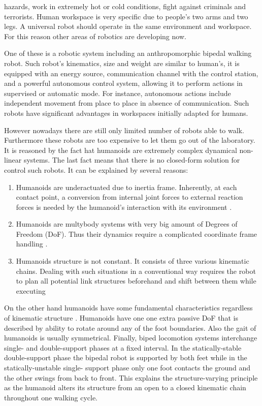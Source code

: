 \documentclass[12pt,a4paper]{report}
\begin{document}
hazards, work in extremely hot or cold conditions, fight against criminals and terrorists.
		Human workspace is very specific due to people's two arms and two legs. A universal robot should operate in the same environment and workspace. For this reason other areas of robotics are developing now.
		
		One of these is a robotic system including an anthropomorphic bipedal walking robot. Such robot's kinematics, size and weight are similar to human's, it is equipped with an energy source, communication channel with the control station, and a powerful autonomous control system, allowing it to perform actions in supervised or automatic mode. For instance, autonomous actions include independent movement from place to place in absence of communication. Such robots have significant advantages in workspaces initially adapted for humans.
		
		However nowadays there are still only limited number of robots able to walk. Furthermore these robots are too expensive to let them go out of the laboratory. It is reasoned by the fact hat humanoids are extremely complex dynamical non-linear systems. The last fact means that there is no closed-form solution for control such robots. It can be explained by several reasons: 
		
		\begin{enumerate}
			\item Humanoids are underactuated due to inertia frame. Inherently, at each contact point, a conversion from internal joint forces to external reaction forces is needed by the humanoid’s interaction with its environment \cite{sugihara2005fast}.
			\item Humanoids are multybody systems with very big amount of Degrees of Freedom (DoF). Thus their dynamics require a complicated coordinate frame handling \cite{sugihara2005fast}. 
			\item Humanoids structure is not constant. It consists of three various kinematic chains. Dealing with such situations in a conventional way requires the robot to plan all potential link structures beforehand and shift between them while executing \cite{	sugihara2005fast}
		\end{enumerate}
		
		On the other hand humanoids have some fundamental characteristics regardless of kinematic structure \cite{vukobratovic2004zero}. Humanoids have one one extra passive DoF that is described by ability to rotate around any of the foot boundaries. Also the gait of humanoids is usually symmetrical. Finally, biped locomotion systems interchange single- and double-support phases at a fixed interval. In the statically-stable double-support phase the bipedal robot is supported by both feet while in the statically-unstable single- support phase only one foot contacts the ground and the other swings from back to front. This explains the structure-varying principle as the humanoid alters its structure from an open to a closed kinematic chain throughout one walking cycle. \cite{controlbipedal}
		
\end{document}
